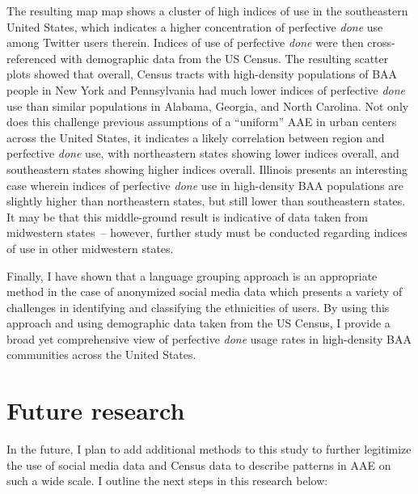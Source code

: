 \documentclass[output=paper,draftmode,colorlinks,citecolor=brown]{langscibook}
\begin{document}
The resulting map map shows a cluster of high indices of use in the southeastern United States, which indicates a higher concentration of perfective \textit{done} use among Twitter users therein. Indices of use of perfective \textit{done} were then cross-referenced with demographic data from the US Census. The resulting scatter plots showed that overall, Census tracts with high-density populations of BAA people in New York and Pennsylvania had much lower indices of perfective \textit{done} use than similar populations in Alabama, Georgia, and North Carolina. Not only does this challenge previous assumptions of a “uniform” AAE in urban centers across the United States, it indicates a likely correlation between region and perfective \textit{done} use, with northeastern states showing lower indices overall, and southeastern states showing higher indices overall. Illinois presents an interesting case wherein indices of perfective \textit{done} use in high-density BAA populations are slightly higher than northeastern states, but still lower than southeastern states. It may be that this middle-ground result is indicative of data taken from midwestern states~-- however, further study must be conducted regarding indices of use in other midwestern states.


Finally, I have shown that a language grouping approach is an appropriate method in the case of anonymized social media data which presents a variety of challenges in identifying and classifying the ethnicities of users. By using this approach and using demographic data taken from the US Census, I provide a broad yet comprehensive view of perfective \textit{done} usage rates in high-density BAA communities across the United States.


\section{Future research} %
\label{sec:baxter:7}
In the future, I plan to add additional methods to this study to further legitimize the use of social media data and Census data to describe patterns in AAE on such a wide scale. I outline the next steps in this research below:
\end{document}
